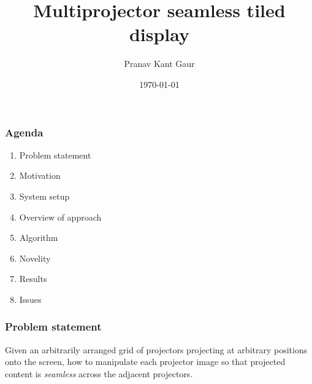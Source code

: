 \documentclass{beamer}
\title{Multiprojector seamless tiled display}
\author{Pranav Kant Gaur}
\institute{Graphics and Visualization section}
\date{\today}
\begin{document}
\begin{frame}
\titlepage
\end{frame}

\begin{frame}
\frametitle{Agenda}
\begin{enumerate}
\item Problem statement
\item Motivation
\item System setup
\item Overview of approach
\item Algorithm 
\item Novelity
\item Results
\item Issues
\end{enumerate}
\end{frame}

\begin{frame}
\frametitle{Problem statement}
Given an arbitrarily arranged grid of projectors projecting at arbitrary positions onto the screen, how to manipulate each projector image so that projected content is \textit{seamless} across the adjacent projectors. 
\end{frame}
\end{document}
